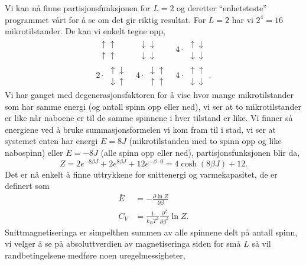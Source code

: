 \documentclass[norsk, 10pt]{article}
\begin{document}
Vi kan nå finne partisjonsfunksjonen for $L=2$ og deretter ``enhetsteste'' programmet vårt for å se om det gir riktig resultat. For $L=2$ har vi $2^{4}=16$ mikrotilstander. De kan vi enkelt tegne opp,
\begin{eqnarray}
	\begin{matrix} \uparrow\uparrow \\ \uparrow\uparrow \end{matrix} & \begin{matrix} \downarrow\downarrow \\ \downarrow\downarrow \end{matrix} & 4\cdot \begin{matrix} \uparrow\downarrow \\ \downarrow\downarrow \end{matrix}\\ 2\cdot\begin{matrix} \uparrow\downarrow \\ \downarrow\uparrow \end{matrix} & 4\cdot \begin{matrix} \downarrow\uparrow \\ \uparrow\uparrow \end{matrix} & 4\cdot\begin{matrix} \uparrow\uparrow \\ \downarrow\downarrow \end{matrix}.
\end{eqnarray}
Vi har ganget med degenerasjonsfaktoren for å vise hvor mange mikrotilstander som har samme energi (og antall spinn opp eller ned), vi ser at to mikrotilstander er like når naboene er til de samme spinnene i hver tilstand er like. Vi finner så energiene ved å bruke summasjonsformelen vi kom fram til i stad, vi ser at systemet enten har energi $E = 8J$ (mikrotilstanden med to spinn opp og like nabospinn) eller $E = -8J$ (alle spinn opp eller ned), partisjonsfunksjonen blir da,
$$ Z = 2e^{-8\beta J} + 2e^{8\beta J} + 12e^{-\beta \cdot0} = 4\cosh(8\beta J) + 12. $$
Det er nå enkelt å finne uttrykkene for snittenergi og varmekapasitet, de er definert som
\begin{align*}
	\bar E &= -\frac{\partial \ln Z}{\partial \beta} \\
	C_V &= \frac{1}{k_B T^2} \frac{\partial^2}{\partial \beta^2}\ln Z.
\end{align*}
Snittmagnetiseringa er simpelthen summen av alle spinnene delt på antall spinn, vi velger å se på absoluttverdien av magnetiseringa siden for små $L$ så vil randbetingelsene medføre noen uregelmessigheter,
\end{document}
